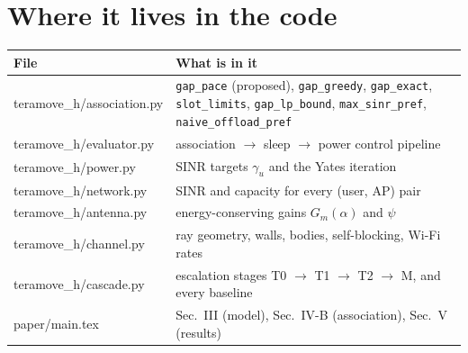 \documentclass[11pt,a4paper]{article}
\begin{document}
\section{Where it lives in the code}
\begin{center}
\begin{tabular}{@{}>{\ttfamily}l >{\raggedright\arraybackslash}p{}@{}}
\toprule
\normalfont File & What is in it\\
\midrule
teramove\_h/association.py & \texttt{gap\_pace} (proposed), \texttt{gap\_greedy}, \texttt{gap\_exact}, \texttt{slot\_limits}, \texttt{gap\_lp\_bound}, \texttt{max\_sinr\_pref}, \texttt{naive\_offload\_pref}\\
teramove\_h/evaluator.py & association $\to$ sleep $\to$ power control pipeline\\
teramove\_h/power.py & SINR targets $\gamma_u$ and the Yates iteration\\
teramove\_h/network.py & SINR and capacity for every (user, AP) pair\\
teramove\_h/antenna.py & energy-conserving gains $G_m(\alpha)$ and $\psi$\\
teramove\_h/channel.py & ray geometry, walls, bodies, self-blocking, Wi-Fi rates\\
teramove\_h/cascade.py & escalation stages T0 $\to$ T1 $\to$ T2 $\to$ M, and every baseline\\
paper/main.tex & Sec.~III (model), Sec.~IV-B (association), Sec.~V (results)\\
\bottomrule
\end{tabular}
\end{center}
\end{document}
